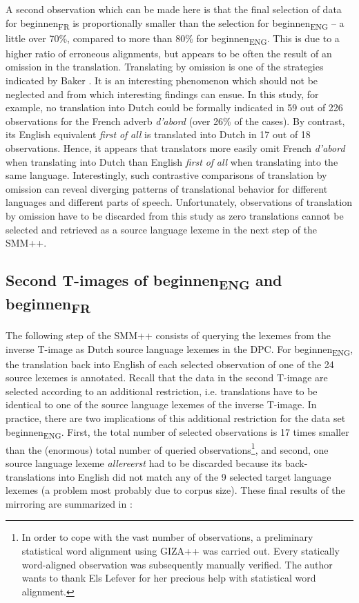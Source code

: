 A second observation which can be made here is that the final selection of data for beginnen\textsubscript{FR} is proportionally smaller than the selection for beginnen\textsubscript{ENG} – a little over 70\%, compared to more than 80\% for beginnen\textsubscript{ENG}. This is due to a higher ratio of erroneous alignments, but appears to be often the result of an omission in the translation. Translating by omission is one of the strategies indicated by Baker \citep[40]{baker_other_1992}. It is an interesting phenomenon which should not be neglected and from which interesting findings can ensue. In this study, for example, no translation into Dutch could be formally indicated in 59 out of 226 observations for the French adverb \textit{d’abord} (over 26\% of the cases). By contrast, its English equivalent \textit{first} \textit{of} \textit{all} is translated into Dutch in 17 out of 18 observations. Hence, it appears that translators more easily omit French \textit{d’abord} when translating into Dutch than English \textit{first} \textit{of} \textit{all} when translating into the same language. Interestingly, such contrastive comparisons of translation by omission can reveal diverging patterns of translational behavior for different languages and different parts of speech. Unfortunately, observations of translation by omission have to be discarded from this study as zero translations cannot be selected and retrieved as a source language lexeme in the next step of the SMM++.


\subsection{Second T-images of beginnen\textsubscript{ENG}\textsubscript{} and beginnen\textsubscript{FR}}
\label{sec:3.6.3}
The following step of the SMM++ consists of querying the lexemes from the inverse T-image as Dutch source language lexemes in the DPC. For beginnen\textsubscript{ENG}, the translation back into English of each selected observation of one of the 24 source lexemes is annotated. Recall that the data in the second T-image are selected according to an additional restriction, i.e. translations have to be identical to one of the source language lexemes of the inverse T-image. In practice, there are two implications of this additional restriction for the data set beginnen\textsubscript{ENG}. First, the total number of selected observations is 17 times smaller than the (enormous) total number of queried observations\footnote{In order to cope with the vast number of observations, a preliminary statistical word alignment using GIZA++ was carried out. Every statically word-aligned observation was subsequently manually verified. The author wants to thank Els Lefever for her precious help with statistical word alignment.}, and second, one source language lexeme \textit{allereerst} had to be discarded because its back-translations into English did not match any of the 9 selected target language lexemes (a problem most probably due to corpus size). These final results of the mirroring are summarized in :

